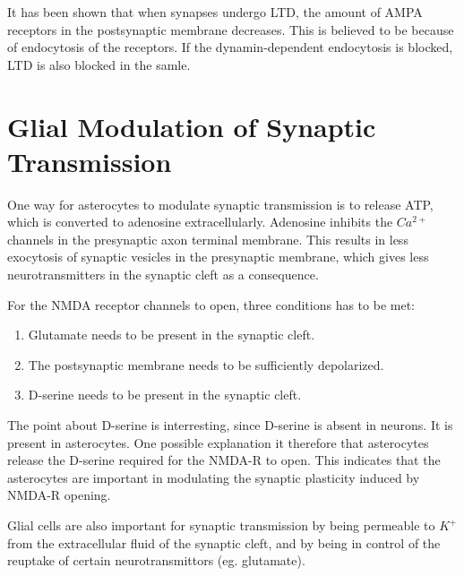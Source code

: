 It has been shown that when synapses undergo LTD, the amount of AMPA receptors in the postsynaptic membrane decreases\cite{AMPARtrafficingArtikkel}. 
This is believed to be because of endocytosis of the receptors. If the dynamin-dependent endocytosis is blocked, LTD is also blocked in the samle\cite{AMPARtrafficingArtikkel}.

\section{Glial Modulation of Synaptic Transmission}
One way for asterocytes to modulate synaptic transmission is to release ATP, which is converted to adenosine extracellularly. 
Adenosine inhibits the $Ca^{2+}$ channels in the presynaptic axon terminal membrane\cite{signallingBetweenGlialAndNeuronsInSynapticPlasticity}. 
This results in less exocytosis of synaptic vesicles in the presynaptic membrane, which gives less neurotransmitters in the synaptic cleft as a consequence\cite{signallingBetweenGlialAndNeuronsInSynapticPlasticity}.

For the NMDA receptor channels to open, three conditions has to be met:
\begin{enumerate}
	\item Glutamate needs to be present in the synaptic cleft.
	\item The postsynaptic membrane needs to be sufficiently depolarized.
	\item D-serine needs to be present in the synaptic cleft\cite{signallingBetweenGlialAndNeuronsInSynapticPlasticity}.
\end{enumerate}
The point about D-serine is interresting, since D-serine is absent in neurons. It is present in asterocytes.
One possible explanation it therefore that asterocytes release the D-serine required for the NMDA-R to open\cite{signallingBetweenGlialAndNeuronsInSynapticPlasticity}.  %
This indicates that the asterocytes are important in modulating the synaptic plasticity induced by NMDA-R opening.

Glial cells are also important for synaptic transmission by being permeable to $K^+$ from the extracellular fluid of the synaptic cleft\cite{PrinciplesOfNeuralScience4edKAP07}, 
and by being in control of the reuptake of certain neurotransmittors (eg. glutamate)\cite{PrinciplesOfNeuralScience4edKAP15}. %


